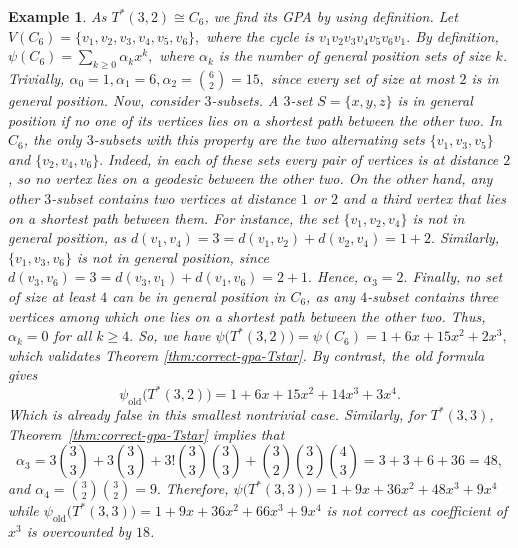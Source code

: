 \documentclass[12pt,twoside]{article}
\newtheorem{example}[theorem]{Example}
\begin{document}
		\begin{example}
			As $T^*(3,2)\cong C_6$, we find its GPA by using definition. Let $ V(C_6)=\{v_1,v_2,v_3,v_4,v_5,v_6\}, $	where the cycle is $	v_1v_2v_3v_4v_5v_6v_1. $ By definition, $
			\psi(C_6)=\sum_{k\ge 0}\alpha_k x^k,	$	where $\alpha_k$ is the number of general position sets of size $k$.
			 Trivially, $\alpha_0=1, \alpha_1=6, \alpha_2=\binom{6}{2}=15,$ since every set of size at most $2$ is in general position.	Now, consider $3$-subsets. 	A $3$-set $S=\{x,y,z\}$ is in general position if no one of its vertices lies on a shortest path between the other two. In $C_6$, the only $3$-subsets with this property are the two alternating sets
			$	\{v_1,v_3,v_5\}$ and $ \{v_2,v_4,v_6\}.	$
			Indeed, in each of these sets every pair of vertices is at distance $2$, so no vertex lies on a geodesic between the other two.
			 On the other hand, any other $3$-subset contains two vertices at distance $1$ or $2$ and a third vertex that lies on a shortest path between them. For instance, the set $\{v_1,v_2,v_4\}$ is not in general position, as $d(v_1,v_4)=3=d(v_1,v_2)+d(v_2,v_4)=1+2.$	Similarly, $\{v_1,v_3,v_6\}$ is not in general position, since
			$d(v_3,v_6)=3=d(v_3,v_1)+d(v_1,v_6)=2+1.$ Hence, $\alpha_3=2.$ Finally, no set of size at least $4$ can be in general position in $C_6$, as any $4$-subset contains three vertices among which one lies on a shortest path between the other two. Thus,  $	\alpha_k=0 $ for all $k\ge 4.$	So, we have	$	\psi\bigl(T^*(3,2)\bigr)=\psi(C_6)=1+6x+15x^2+2x^3,$ which validates Theorem \ref{thm:correct-gpa-Tstar}.	By contrast, the old formula gives
			$$
			\psi_{\mathrm{old}}\bigl(T^*(3,2)\bigr)
			=
			1+6x+15x^2+14x^3+3x^4.
			$$
			Which is already false in this smallest nontrivial case.
		 Similarly, for  $T^*(3,3)$, Theorem~\ref{thm:correct-gpa-Tstar} implies that 
		 $$
			\alpha_3
			=
			3\binom{3}{3}
			+
			3\binom{3}{3}
			+
			3!\binom{3}{3}\binom{3}{3}
			+
			\binom{3}{2}\binom{3}{2}\binom{4}{3}
			=
			3+3+6+36=48,
			$$
			and $\alpha_4=\binom{3}{2}\binom{3}{2}=9.
			$
			Therefore, $\psi\bigl(T^*(3,3)\bigr)=1+9x+36x^2+48x^3+9x^4$ while  $	\psi_{\mathrm{old}}\bigl(T^*(3,3)\bigr)=1+9x+36x^2+66x^3+9x^4$ is not correct as  coefficient of $x^3$ is overcounted by $18$.
		 

\end{example}
\end{document}
